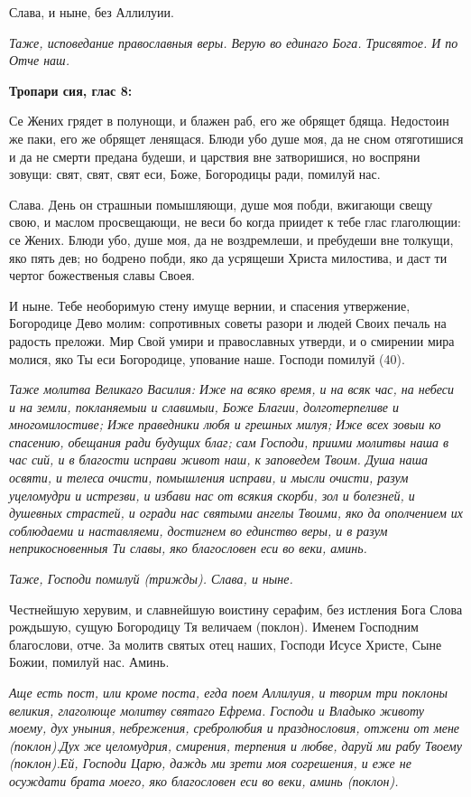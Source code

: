 Слава, и ныне, без Аллилуии. 

\itshape Таже, исповедание православныя веры.\normalfont{} Верую во единаго Бога. Трисвятое. И по Отче наш. 


\medskip


\bfseries Тропари сия, глас 8:\normalfont{}


Се Жених грядет в полунощи, и блажен раб, его же обрящет бдяща. Недостоин же паки, его же обрящет ленящася. Блюди убо душе моя, да не сном отяготишися и да не смерти предана будеши, и царствия вне затворишися, но воспряни зовущи: свят, свят, свят еси, Боже, Богородицы ради, помилуй нас. 

Слава. День он страшныи помышляющи, душе моя побди, вжигающи свещу свою, и маслом просвещающи, не веси бо когда приидет к тебе глас глаголющии: се Жених. Блюди убо, душе моя, да не воздремлеши, и пребудеши вне толкущи, яко пять дев; но бодрено побди, яко да усрящеши Христа милостива, и даст ти чертог божественыя славы Своея. 

И ныне. Тебе необоримую стену имуще вернии, и спасения утвержение, Богородице Дево молим: сопротивных советы разори и людей Своих печаль на радость преложи. Мир Свой умири и православных утверди, и о смирении мира молися, яко Ты еси Богородице, упование наше. Господи помилуй (40). 


\medskip


\itshape Таже молитва Великаго Василия:\normalfont{} Иже на всяко время, и на всяк час, на небеси и на земли, покланяемыи и славимыи, Боже Благии, долготерпеливе и многомилостиве; Иже праведники любя и грешных милуя; Иже всех зовыи ко спасению, обещания ради будущих благ; сам Господи, приими молитвы наша в час сий, и в благости исправи живот наш, к заповедем Твоим. Душа наша освяти, и телеса очисти, помышления исправи, и мысли очисти, разум уцеломудри и истрезви, и избави нас от всякия скорби, зол и болезней, и душевных страстей, и огради нас святыми ангелы Твоими, яко да ополчением их соблюдаеми и наставляеми, достигнем во единство веры, и в разум неприкосновенныя Ти славы, яко благословен еси во веки, аминь. 

\itshape Таже, Господи помилуй\normalfont{} (трижды). Слава, и ныне. 

Честнейшую херувим, и славнейшую воистину серафим, без истления Бога Слова рождьшую, сущую Богородицу Тя величаем (поклон). Именем Господним благослови, отче. За молитв святых отец наших, Господи Исусе Христе, Сыне Божии, помилуй нас. Аминь. 

\itshape Аще есть пост, или кроме поста, егда поем Аллилуия, и творим три поклоны великия, глаголюще молитву святаго Ефрема\normalfont{}. Господи и Владыко животу моему, дух уныния, небрежения, сребролюбия и празднословия, отжени от мене (поклон).Дух же целомудрия, смирения, терпения и любве, даруй ми рабу Твоему (поклон).Ей, Господи Царю, даждь ми зрети моя согрешения, и еже не осуждати брата моего, яко благословен еси во веки, аминь (поклон).

